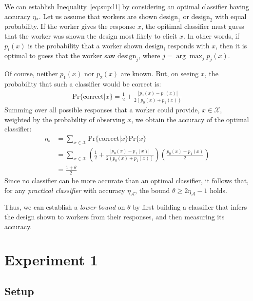 \documentclass{sigchi}
\begin{document}
We can establish Inequality~\ref{eq:sup:l1} by considering an
optimal classifier having accuracy $\eta_*$.  
Let us assume that workers are shown 
$\mathrm{design}_1$ or $\mathrm{design}_2$ with equal probability.
If the worker gives the response $x$, the opitimal classifier must guess
that the worker was shown the design most likely to elicit $x$.
In other words, if $p_i(x)$ is the probability that a worker shown 
$\mathrm{design}_i$ responds with $x$, then it is optimal to 
guess that the worker saw $\mathrm{design}_j$, where 
$j = \arg\max_j{p_j(x)}$.

Of course, neither $p_1(x)$ nor $p_2(x)$ are known.  But, on seeing $x$,
the probability that such a classifier would be correct is:
\begin{align}
  \mathrm{Pr}\{\mathrm{correct}|x\} = \frac{1}{2} 
	+ \frac{|p_0(x) - p_1(x)|}{2(p_0(x) + p_1(x))}
\end{align}
Summing over all possible responses that a worker could provide, 
$x \in \mathcal{X}$, weighted by the probability of observing $x$, 
we obtain the accuracy of the optimal classifier:
\begin{align}
\eta_* 
  &= \sum_{x\in\mathcal{X}} 
	\mathrm{Pr}\{\mathrm{correct}|x\}\mathrm{Pr}\{x\} \\
  &= \sum_{x\in\mathcal{X}} 
	\left(
	\frac{1}{2} + \frac{|p_0(x) - p_1(x)|}{2(p_0(x) + p_1(x))}
  \right) \left( 
	\frac{p_0(x) + p_1(x)}{2} 
  \right) \\
  &= \frac{1 + \theta}{2}
\end{align}
Since no classifier can be more accurate than an optimal classifier,
it follows that, for any \textit{practical classifier} 
with accuracy $\eta_\mathcal{A}$, the bound 
$\theta \geq 2\eta_\mathcal{A} -1$ holds.

Thus, we can establish a \textit{lower bound} on $\theta$ by first 
building a classifier that infers the design shown to workers from their 
responses, and then measuring its accuracy.

\section{Experiment 1}
\subsection{Setup}
\end{document}
